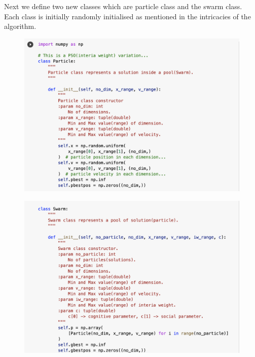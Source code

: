\documentclass[12pt]{article}
\newcommand{\nd}{\noindent}
\begin{document}
\nd Next we define two new classes which are particle class and the swarm class. Each class is initially randomly initialised as mentioned in the intricacies of the algorithm. 

\hspace{-5mm}
\begin{figure}[h]
\centering
\begin{minipage}{.5\textwidth}
  \centering
  \includegraphics[width=1.0\linewidth]{par.png}
  \label{fig:test1}
\end{minipage}%
\begin{minipage}{.5\textwidth}
  \centering
  \includegraphics[width=1.0\linewidth]{swa.png}
  \label{fig:test2}
\end{minipage}
\end{figure}
\end{document}
